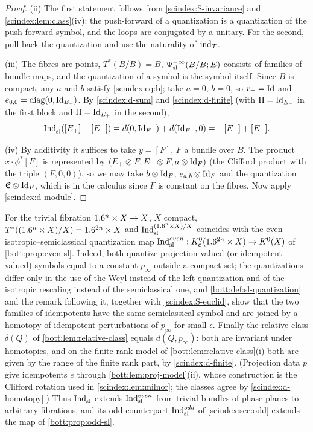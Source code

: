 \begin{proof}
  (ii) The first statement follows from \ref{scindex:S-invariance} and
  \cref{scindex:lem:class}(iv): the push-forward of a quantization is a
  quantization of the push-forward symbol, and the loops are conjugated by a
  unitary. For the second, pull back the quantization and use the naturality of
  $\operatorname{ind}_{\mathcal T}$.

  (iii) The fibres are points, $T^*(B/B)=B$, $\Psi^{-\infty}_{\mathrm{sl}}(B/B;E)$ consists
  of families of bundle maps, and the quantization of a symbol is the symbol
  itself. Since $B$ is compact, any $a$ and $b$ satisfy \eqref{scindex:eq:b};
  take $a=0$, $b=0$, so $r_\pm=\operatorname{Id}$ and $e_{0,0}=\operatorname{diag}(0,\operatorname{Id}_{E_+})$. By
  \ref{scindex:d-sum} and \ref{scindex:d-finite} (with $\Pi=\operatorname{Id}_{E_-}$ in the
  first block and $\Pi=\operatorname{Id}_{E_+}$ in the second),
  \begin{equation*}
    \operatorname{Ind}^{}_{\mathrm{sl}}([E_+]-[E_-])=d(0,\operatorname{Id}_{E_-})+d(\operatorname{Id}_{E_+},0)=-[E_-]+[E_+].
  \end{equation*}

  (iv) By additivity it suffices to take $y=[F]$, $F$ a bundle over $B$. The
  product $x\cdot\phi^*[F]$ is represented by $(E_+\otimes F,E_-\otimes F,
  a\otimes\operatorname{Id}_F)$ (the Clifford product with the triple $(F,0,0)$), so we may take
  $b\otimes\operatorname{Id}_F$, $e_{a,b}\otimes\operatorname{Id}_F$ and the quantization $\mathfrak E\otimes
  \operatorname{Id}_F$, which is in the calculus since $F$ is constant on the fibres. Now
  apply \ref{scindex:d-module}.
\end{proof}

\begin{remark}\label{scindex:rem:compare-bott}
  For the trivial fibration $1.6^n\times X\to X$, $X$ compact, $T^*((1.6^n\times X)/X)=
  1.6^{2n}\times X$ and $\operatorname{Ind}^{(1.6^n\times X)/X}_{\mathrm{sl}}$ coincides with the even
  isotropic--semiclassical quantization map $\operatorname{Ind}^{even}_{\mathrm{sl}}:K_{\mathrm{c}}^0(1.6^{2n}\times X)\to
  K^0(X)$ of \cref{bott:prop:even-sl}. Indeed, both quantize projection-valued (or
  idempotent-valued) symbols equal to a constant $p_\infty$ outside a compact set;
  the quantizations differ only in the use of the Weyl instead of the left
  quantization and of the isotropic rescaling instead of the semiclassical one,
  and \cref{bott:def:sl-quantization} and the remark following it, together with
  \ref{scindex:S-euclid}, show that the two families of idempotents have the same
  semiclassical symbol and are joined by a homotopy of idempotent perturbations of
  $p_\infty$ for small $\epsilon$. Finally the relative class $\delta(Q)$ of
  \cref{bott:lem:relative-class} equals $d(Q,p_\infty)$: both are invariant under
  homotopies, and on the finite rank model of \cref{bott:lem:relative-class}(i)
  both are given by the range of the finite rank part, by
  \ref{scindex:d-finite}. (Projection data $p$ give idempotents $e$ through
  \cref{bott:lem:proj-model}(ii), whose construction is the Clifford rotation
  used in \cref{scindex:lem:milnor}; the classes agree by \ref{scindex:d-homotopy}.)
  Thus $\operatorname{Ind}^{}_{\mathrm{sl}}$ extends $\operatorname{Ind}^{even}_{\mathrm{sl}}$ from trivial bundles of phase planes to
  arbitrary fibrations, and its odd counterpart $\operatorname{Ind}^{odd}_{\mathrm{sl}}$ of
  \cref{scindex:sec:odd} extends the map of \cref{bott:prop:odd-sl}.
\end{remark}

